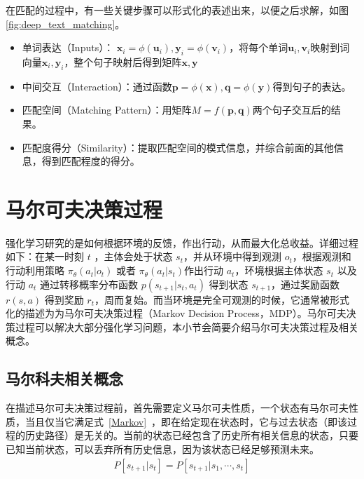 在匹配的过程中，有一些关键步骤可以形式化的表述出来，以便之后求解，如图\ref{fig:deep_text_matching}。

\begin{itemize}
	\item 单词表达（Inputs）： $\mathbf{x}_i = \phi(\mathbf{u}_i), \mathbf{y}_i = \phi(\mathbf{v}_i)$，将每个单词$\mathbf{u}_i, \mathbf{v}_i$映射到词向量$\mathbf{x}_i, \mathbf{y}_i$，整个句子映射后得到矩阵$\mathbf{x}, \mathbf{y}$
	\item 中间交互（Interaction）：通过函数$\mathbf{p}=\phi (\mathbf{x}), \mathbf{q} = \phi (\mathbf{y})$得到句子的表达。
	\item 匹配空间（Matching Pattern）：用矩阵$M = f(\mathbf{p}, \mathbf{q})$两个句子交互后的结果。
	\item 匹配度得分（Similarity）：提取匹配空间的模式信息，并综合前面的其他信息，得到匹配程度的得分。
\end{itemize}




\section{马尔可夫决策过程}
强化学习研究的是如何根据环境的反馈，作出行动，从而最大化总收益。详细过程如下：在某一时刻 $t$ ，主体会处于状态 $s_t$，并从环境中得到观测 $o_t$，根据观测和行动利用策略 $\pi_\theta(a_t|o_t)$ 或者 $\pi_\theta(a_t|s_t)$作出行动 $a_t$，环境根据主体状态 $s_t$ 以及行动 $a_t$ 通过转移概率分布函数 $p(s_{t+1}| s_t, a_t)$ 得到状态 $s_{t+1}$，通过奖励函数 $r(s, a)$ 得到奖励 $r_t$，周而复始。而当环境是完全可观测的时候，它通常被形式化的描述为为马尔可夫决策过程（Markov Decision Process，MDP）。马尔可夫决策过程可以解决大部分强化学习问题\cite{Sutton1998ReinFORcementL}，本小节会简要介绍马尔可夫决策过程及相关概念。

\subsection{马尔科夫相关概念}

在描述马尔可夫决策过程前，首先需要定义马尔可夫性质，一个状态有马尔可夫性质，当且仅当它满足式~\eqref{Markov}~，即在给定现在状态时，它与过去状态（即该过程的历史路径）是无关的。当前的状态已经包含了历史所有相关信息的状态，只要已知当前状态，可以丢弃所有历史信息，因为该状态已经足够预测未来。
\begin{equation}
\label{Markov}
\begin{aligned}
P[s_{t+1}|s_t]=P[s_{t+1}|s_1,\cdots,s_t]
\end{aligned}
\end{equation}

